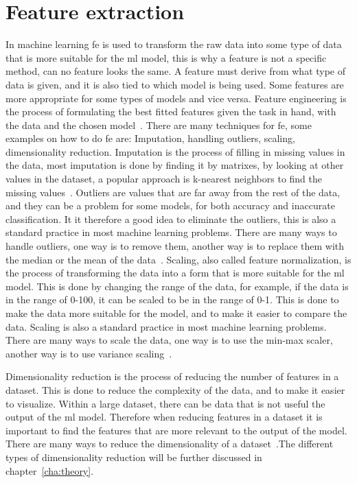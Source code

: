 \section{Feature extraction}\label{sec:feature-extraction}
In machine learning \gls{fe} is used to transform the raw data into some type of data that is more suitable for the \gls{ml} model, this is why a feature is not a specific method, can no feature looks the same. A feature must derive from what type of data is given, and it is also tied to which model is being used. Some features are more appropriate for some types of models and vice versa. Feature engineering is the process of formulating the best fitted features given the task in hand, with the data and the chosen model~\cite{Feature-engineering-zheng}. 
There are many techniques for \gls{fe}, some examples on how to do \gls{fe} are: Imputation, handling outliers, scaling, dimensionality reduction. Imputation is the process of filling in missing values in the data, most imputation is done by finding it by matrixes, by looking at other values in the dataset, a popular approach is k-nearest neighbors to find the missing values~\cite{imputation-for-tables-Biessmann}. Outliers are values that are far away from the rest of the data, and they can be a problem for some models, for both accuracy and inaccurate classification. It it therefore a good idea to eliminate the outliers, this is also a standard practice in most machine learning problems. There are many ways to handle outliers, one way is to remove them, another way is to replace them with the median or the mean of the data~\cite{outlier-perez}. Scaling, also called feature normalization, is the process of transforming the data into a form that is more suitable for the \gls{ml} model. This is done by changing the range of the data, for example, if the data is in the range of 0-100, it can be scaled to be in the range of 0-1. This is done to make the data more suitable for the model, and to make it easier to compare the data. Scaling is also a standard practice in most machine learning problems. There are many ways to scale the data, one way is to use the min-max scaler, another way is to use variance scaling~\cite{Feature-engineering-zheng}. 

Dimensionality reduction is the process of reducing the number of features in a dataset. This is done to reduce the complexity of the data, and to make it easier to visualize. Within a large dataset, there can be data that is not useful the output of the \gls{ml} model. Therefore when reducing features in a dataset it is important to find the features that are more relevant to the output of the model. There are many ways to reduce the dimensionality of a dataset~\cite{Feature-engineering-zheng}.The different types of dimensionality reduction will be further discussed in chapter~\ref{cha:theory}.

